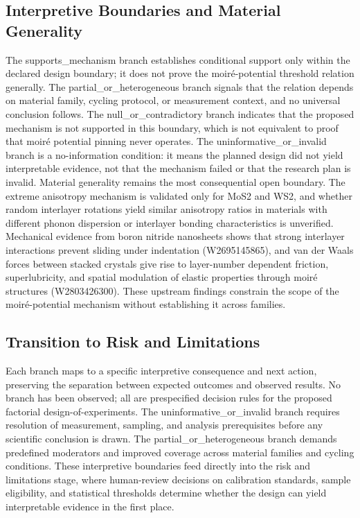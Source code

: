 \documentclass[conference]{IEEEtran}
\begin{document}
\subsection{Interpretive Boundaries and Material Generality}
The supports\_mechanism branch establishes conditional support only within the declared design boundary; it does not prove the moiré-potential threshold relation generally. The partial\_or\_heterogeneous branch signals that the relation depends on material family, cycling protocol, or measurement context, and no universal conclusion follows. The null\_or\_contradictory branch indicates that the proposed mechanism is not supported in this boundary, which is not equivalent to proof that moiré potential pinning never operates. The uninformative\_or\_invalid branch is a no-information condition: it means the planned design did not yield interpretable evidence, not that the mechanism failed or that the research plan is invalid. Material generality remains the most consequential open boundary. The extreme anisotropy mechanism is validated only for MoS2 and WS2, and whether random interlayer rotations yield similar anisotropy ratios in materials with different phonon dispersion or interlayer bonding characteristics is unverified. Mechanical evidence from boron nitride nanosheets shows that strong interlayer interactions prevent sliding under indentation (W2695145865), and van der Waals forces between stacked crystals give rise to layer-number dependent friction, superlubricity, and spatial modulation of elastic properties through moiré structures (W2803426300). These upstream findings constrain the scope of the moiré-potential mechanism without establishing it across families.~\cite{cite_6b49ace365c37cc5,cite_78dc2ce387cb7c90,cite_54b9175b8bb4c4e0}

\subsection{Transition to Risk and Limitations}
Each branch maps to a specific interpretive consequence and next action, preserving the separation between expected outcomes and observed results. No branch has been observed; all are prespecified decision rules for the proposed factorial design-of-experiments. The uninformative\_or\_invalid branch requires resolution of measurement, sampling, and analysis prerequisites before any scientific conclusion is drawn. The partial\_or\_heterogeneous branch demands predefined moderators and improved coverage across material families and cycling conditions. These interpretive boundaries feed directly into the risk and limitations stage, where human-review decisions on calibration standards, sample eligibility, and statistical thresholds determine whether the design can yield interpretable evidence in the first place.
\end{document}
